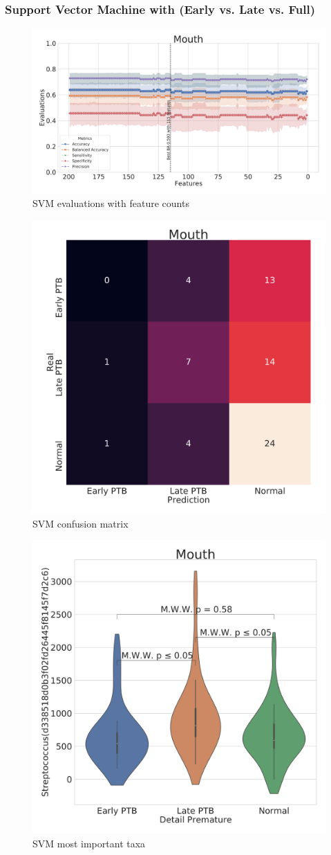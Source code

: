 \documentclass{beamer}
\begin{document}
    \begin{frame}[allowframebreaks]
        \frametitle{Support Vector Machine with (Early vs. Late vs. Full)}

        \begin{figure}
            \includegraphics[width=0.8 \linewidth]{figures/SVM/SVM.DADA2.homd/Mouth+metrics.pdf}
            \caption{SVM evaluations with feature counts}
        \end{figure}

        \begin{figure}
            \includegraphics[width=0.5 \linewidth]{figures/SVM/SVM.DADA2.homd/Mouth+heatmap.pdf}
            \caption{SVM confusion matrix}
        \end{figure}

        \begin{figure}
            \includegraphics[width=0.5 \linewidth]{figures/SVM/SVM.DADA2.homd/Mouth+Violin_0.pdf}
            \caption{SVM most important taxa}
        \end{figure}
    \end{frame}
\end{document}
